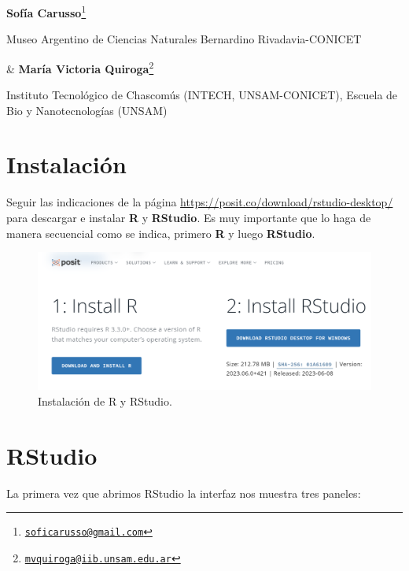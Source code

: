 \documentclass[
]{book}
\begin{document}
\textbf{Sofía Carusso}\footnote{\href{mailto:soficarusso@gmail.com}{\nolinkurl{soficarusso@gmail.com}}}

Museo Argentino de Ciencias Naturales Bernardino Rivadavia-CONICET

\& \textbf{María Victoria Quiroga}\footnote{\href{mailto:mvquiroga@iib.unsam.edu.ar}{\nolinkurl{mvquiroga@iib.unsam.edu.ar}}}

Instituto Tecnológico de Chascomús (INTECH, UNSAM-CONICET), Escuela de Bio y Nanotecnologías (UNSAM)

\hypertarget{instalaciuxf3n}{%
\section{Instalación}\label{instalaciuxf3n}}

Seguir las indicaciones de la página \url{https://posit.co/download/rstudio-desktop/} para descargar e instalar \textbf{R} y \textbf{RStudio}. Es muy importante que lo haga de manera secuencial como se indica, primero \textbf{R} y luego \textbf{RStudio}.

\begin{figure}

{\centering \includegraphics[width=1\linewidth]{./images/posit} 

}

\caption{Instalación de R y RStudio.}\label{fig:posit}
\end{figure}

\hypertarget{rstudio}{%
\section{RStudio}\label{rstudio}}

La primera vez que abrimos RStudio la interfaz nos muestra tres paneles:
\end{document}

